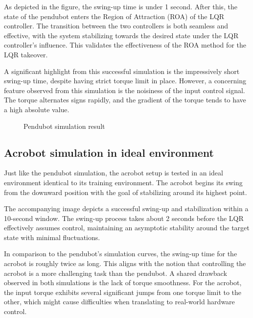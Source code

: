 As depicted in the figure, the swing-up time is under 1 second. After this, the state of the pendubot enters the Region of Attraction (ROA) of the LQR controller. The transition between the two controllers is both seamless and effective, with the system stabilizing towards the desired state under the LQR controller's influence. This validates the effectiveness of the ROA method for the LQR takeover.

A significant highlight from this successful simulation is the impressively short swing-up time, despite having strict torque limit in place. However, a concerning feature observed from this simulation is the noisiness of the input control signal. The torque alternates signs rapidly, and the gradient of the torque tends to have a high absolute value.

\begin{figure}[H]
    \centering
    \caption{Pendubot simulation result}
    \label{fig:image_a}
\end{figure}

\subsection{Acrobot simulation in ideal environment}

Just like the pendubot simulation, the acrobot setup is tested in an ideal environment identical to its training environment. The acrobot begins its swing from the downward position with the goal of stabilizing around its highest point.

The accompanying image depicts a successful swing-up and stabilization within a 10-second window. The swing-up process takes about 2 seconds before the LQR effectively assumes control, maintaining an asymptotic stability around the target state with minimal fluctuations.

In comparison to the pendubot's simulation curves, the swing-up time for the acrobot is roughly twice as long. This aligns with the notion that controlling the acrobot is a more challenging task than the pendubot. A shared drawback observed in both simulations is the lack of torque smoothness. For the acrobot, the input torque exhibits several significant jumps from one torque limit to the other, which might cause difficulties when translating to real-world hardware control.

